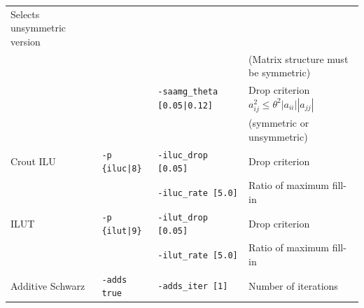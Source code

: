 \documentclass[a4paper]{article}
\begin{document}
\begin{minipage}[t]{\textwidth}
\begin{center}
\begin{tabular}{l|lll}
 Selects unsymmetric version    \\
         &                       &                             & (Matrix structure must be symmetric)    \\
         &                       & \verb=-saamg_theta [0.05|0.12]= & Drop criterion $a^2_{ij}\le\theta^2|a_{ii}||a_{jj}|$ \\
         &                       &                             & (symmetric or unsymmetric) \\
Crout ILU& \verb=-p {iluc|8}=    & \verb=-iluc_drop [0.05]=    & Drop criterion    \\
         &                       & \verb=-iluc_rate [5.0]=     & Ratio of maximum fill-in \\
ILUT     & \verb=-p {ilut|9}=    & \verb=-ilut_drop [0.05]=    & Drop criterion    \\
         &                       & \verb=-ilut_rate [5.0]=     & Ratio of maximum fill-in \\
Additive Schwarz  & \verb=-adds true=   &  \verb=-adds_iter [1]= & Number of iterations   \\
\hline         
\end{tabular}
\end{center}
\end{minipage}
\\ \\
\newpage
\end{document}
